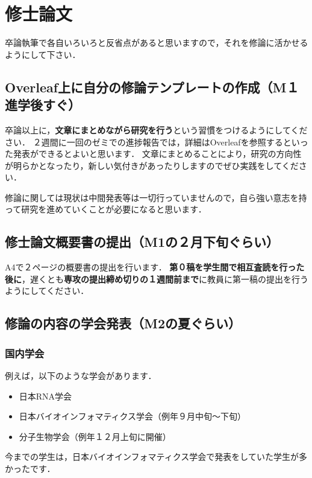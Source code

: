\documentclass[dvipdfmx,autodetect-engine]{jsreport}
\begin{document}
\section{修士論文}

卒論執筆で各自いろいろと反省点があると思いますので，それを修論に活かせるようにして下さい．

\subsection{Overleaf上に自分の修論テンプレートの作成（M１進学後すぐ）}

卒論以上に，\textbf{文章にまとめながら研究を行う}という習慣をつけるようにしてください．
２週間に一回のゼミでの進捗報告では，詳細はOverleafを参照するといった発表ができるとよいと思います．
文章にまとめることにより，研究の方向性が明らかとなったり，新しい気付きがあったりしますのでぜひ実践をしてください．

修論に関しては現状は中間発表等は一切行っていませんので，自ら強い意志を持って研究を進めていくことが必要になると思います．


\subsection{修士論文概要書の提出（M1の２月下旬ぐらい）}

A4で２ページの概要書の提出を行います．
\textbf{第０稿を学生間で相互査読を行った後に}，遅くとも\textbf{専攻の提出締め切りの１週間前まで}に教員に第一稿の提出を行うようにしてください．

\subsection{修論の内容の学会発表（M2の夏ぐらい）}

\subsubsection{国内学会}

例えば，以下のような学会があります．
\begin{itemize}
\item 日本RNA学会
\item 日本バイオインフォマティクス学会（例年９月中旬〜下旬）
\item 分子生物学会（例年１２月上旬に開催）
\end{itemize}

今までの学生は，日本バイオインフォマティクス学会で発表をしていた学生が多かったです．
\end{document}
